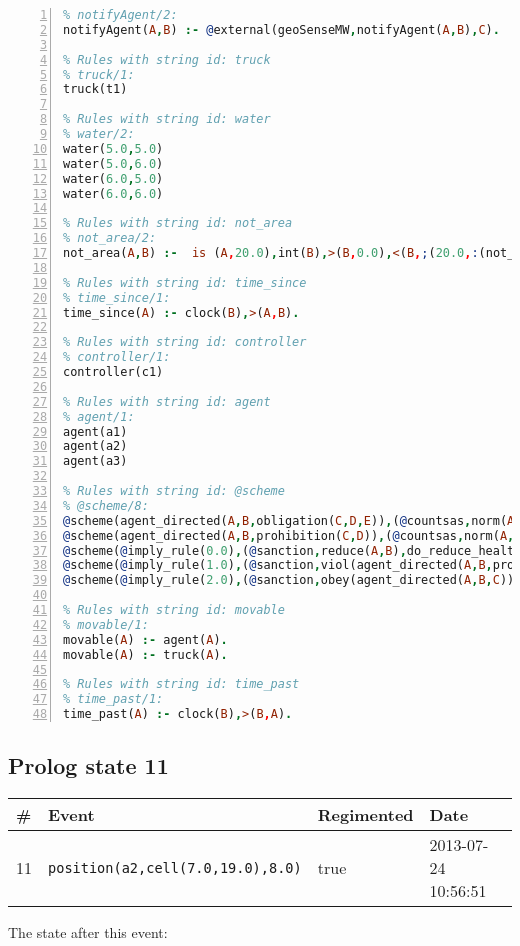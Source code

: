 \documentclass[11pt]{article}\usepackage[utf8]{inputenc}\usepackage{geometry}
\begin{document}
\begin{lstlisting}[language=Prolog, numbers=left]
% Rules with string id: notifyAgent
% notifyAgent/2:
notifyAgent(A,B) :- @external(geoSenseMW,notifyAgent(A,B),C).

% Rules with string id: truck
% truck/1:
truck(t1)

% Rules with string id: water
% water/2:
water(5.0,5.0)
water(5.0,6.0)
water(6.0,5.0)
water(6.0,6.0)

% Rules with string id: not_area
% not_area/2:
not_area(A,B) :-  is (A,20.0),int(B),>(B,0.0),<(B,;(20.0,:(not_area(A,B), is (-(B),20.0)))),int(A),>(A,0.0),<(A,;(20.0,:(area(A,B),-(int(A))))),int(B),>(A,0.0),>(B,0.0),<(A,21.0),<(B,21.0).

% Rules with string id: time_since
% time_since/1:
time_since(A) :- clock(B),>(A,B).

% Rules with string id: controller
% controller/1:
controller(c1)

% Rules with string id: agent
% agent/1:
agent(a1)
agent(a2)
agent(a3)

% Rules with string id: @scheme
% @scheme/8:
@scheme(agent_directed(A,B,obligation(C,D,E)),(@countsas,norm(A,B,F,obligation(C,D,E)),F),false,(listTrue(C)),(time_past(D)),false,[plus(viol(agent_directed(A,B,obligation(C,D,E))))|[]],[plus(obey(agent_directed(A,B,obligation(C,D,E))))|[]])
@scheme(agent_directed(A,B,prohibition(C,D)),(@countsas,norm(A,B,E,prohibition(C,D)),E),(listTrue(C)),false,(false),false,[plus(viol(agent_directed(A,B,prohibition(C,D))))|[]],[plus(obey(agent_directed(A,B,prohibition(C,D))))|[]])
@scheme(@imply_rule(0.0),(@sanction,reduce(A,B),do_reduce_health(A,B),notifyAgent(A,changed(status))),true,false,false,false,[min(reduce(A,B))|[]],[])
@scheme(@imply_rule(1.0),(@sanction,viol(agent_directed(A,B,prohibition(C,D))),do_sanction(D)),true,false,false,false,[min(viol(agent_directed(A,B,prohibition(C,D))))|[]],[])
@scheme(@imply_rule(2.0),(@sanction,obey(agent_directed(A,B,C))),true,false,false,false,[min(obey(agent_directed(A,B,C)))|[]],[])

% Rules with string id: movable
% movable/1:
movable(A) :- agent(A).
movable(A) :- truck(A).

% Rules with string id: time_past
% time_past/1:
time_past(A) :- clock(B),>(B,A).

\end{lstlisting}
\clearpage 
\subsection{Prolog state 11}
\begin{table}[ht]
\centering 
\begin{tabular}{l l l l} 
\textbf{\#} & \textbf{Event} & \textbf{Regimented} & \textbf{Date} \\ [0.5ex] 
\hline
11&\texttt{position(a2,cell(7.0,19.0),8.0)}&true&2013-07-24 10:56:51\\ [1ex] \hline\end{tabular}
\end{table}
The state after this event:
\end{document}
